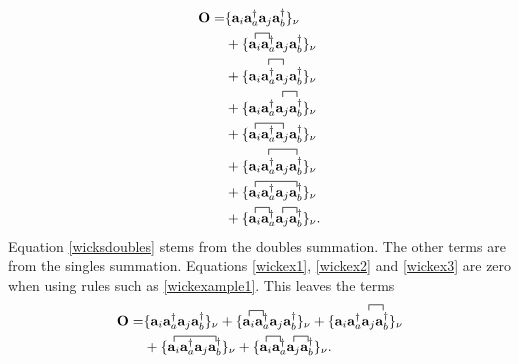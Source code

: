 \documentclass[a4paper,norsk,11pt,twoside]{report}
\begin{document}
\begin{align}
\textbf{O} = & 
\{
\textbf{a}_i \textbf{a}^{\dag}_a \textbf{a}_j \textbf{a}^{\dag}_b
\}_{\nu} \\ &
+ \{
\contraction{}{\textbf{a}_i}{}{\textbf{a}^{\dag}_a}
\textbf{a}_i \textbf{a}^{\dag}_a
\textbf{a}_j \textbf{a}^{\dag}_b
\}_{\nu} \\ &
+ \{
\textbf{a}_i
\contraction{}{\textbf{a}^{\dag}_a}{}{\textbf{a}_j}
\textbf{a}^{\dag}_a \textbf{a}_j
\textbf{a}^{\dag}_b
\}_{\nu} \label{wickex1} \\ &
+ \{
\textbf{a}_i \textbf{a}^{\dag}_a
\contraction{}{\textbf{a}^j}{}{\textbf{a}^{\dag}_b}
\textbf{a}_j \textbf{a}^{\dag}_b
\}_{\nu} \\ &
+ \{
\contraction{}{\textbf{a}_i}{\textbf{a}^{\dag}_a}{\textbf{a}_j}
\textbf{a}_i \textbf{a}^{\dag}_a \textbf{a}_j
\textbf{a}^{\dag}_b
\}_{\nu} \label{wickex2} \\ &
+ \{
\textbf{a}_i
\contraction{}{\textbf{a}^{\dag}_a}{\textbf{a}_j}{\textbf{a}^{\dag}_b}
\textbf{a}^{\dag}_a \textbf{a}_j \textbf{a}^{\dag}_b
\}_{\nu} \label{wickex3} \\ &
+ \{
\contraction{}{\textbf{a}_i}{\textbf{a}^{\dag}_a \textbf{a}_j}{\textbf{a}^{\dag}_b}
\textbf{a}_i \textbf{a}^{\dag}_a \textbf{a}_j \textbf{a}^{\dag}_b
\}_{\nu} \label{wickex4} \\ &
+ \{
\contraction{}{\textbf{a}_i}{}{\textbf{a}^{\dag}_a}
\textbf{a}_i \textbf{a}^{\dag}_a 
\contraction{}{\textbf{a}_j}{}{\textbf{a}^{\dag}_b}
\textbf{a}_j \textbf{a}^{\dag}_b
\}_{\nu} . \label{wicksdoubles}
\end{align}
Equation \eqref{wicksdoubles} stems from the doubles summation. The
other terms are from the singles summation. Equations \eqref{wickex1},
\eqref{wickex2} and \eqref{wickex3} are zero when using rules such
as \eqref{wickexample1}. This leaves the terms
\begin{align}
\textbf{O} = & 
\{
\textbf{a}_i \textbf{a}^{\dag}_a \textbf{a}_j \textbf{a}^{\dag}_b
\}_{\nu}
+ \{
\contraction{}{\textbf{a}_i}{}{\textbf{a}^{\dag}_a}
\textbf{a}_i \textbf{a}^{\dag}_a
\textbf{a}_j \textbf{a}^{\dag}_b
\}_{\nu}
+ \{
\textbf{a}_i \textbf{a}^{\dag}_a
\contraction{}{\textbf{a}^j}{}{\textbf{a}^{\dag}_b}
\textbf{a}_j \textbf{a}^{\dag}_b
\}_{\nu} \nonumber \\ &
+ \{
\contraction{}{\textbf{a}_i}{\textbf{a}^{\dag}_a \textbf{a}_j}{\textbf{a}^{\dag}_b}
\textbf{a}_i \textbf{a}^{\dag}_a \textbf{a}_j \textbf{a}^{\dag}_b
\}_{\nu}
+ \{
\contraction{}{\textbf{a}_i}{}{\textbf{a}^{\dag}_a}
\textbf{a}_i \textbf{a}^{\dag}_a 
\contraction{}{\textbf{a}_j}{}{\textbf{a}^{\dag}_b}
\textbf{a}_j \textbf{a}^{\dag}_b
\}_{\nu} .
\end{align}
\end{document}
